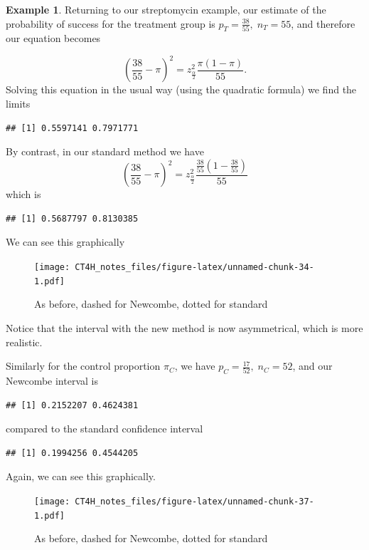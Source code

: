 \documentclass[
  openany]{book}
\theoremstyle{definition}
\theoremstyle{definition}
\newtheorem{example}{Example}[chapter]
\theoremstyle{definition}
\theoremstyle{definition}
\theoremstyle{remark}
\begin{document}
\begin{example}

Returning to our streptomycin example, our estimate of the probability of success for the treatment group is \(p_T = \frac{38}{55},\;n_T = 55\), and therefore our equation becomes

\[\left(\frac{38}{55} - \pi\right)^2 = z^2_{\frac{\alpha}{2}}\frac{\pi\left(1-\pi\right)}{55}.\]
Solving this equation in the usual way (using the quadratic formula) we find the limits

\begin{verbatim}
## [1] 0.5597141 0.7971771
\end{verbatim}

By contrast, in our standard method we have
\[\left(\frac{38}{55} - \pi\right)^2 = z^2_{\frac{\alpha}{2}}\frac{\frac{38}{55}\left(1-\frac{38}{55}\right)}{55}\]
which is

\begin{verbatim}
## [1] 0.5687797 0.8130385
\end{verbatim}

We can see this graphically

\begin{figure}
\centering
\texttt{[image: CT4H\_notes\_files/figure-latex/unnamed-chunk-34-1.pdf]}
\caption{\label{fig:unnamed-chunk-34}As before, dashed for Newcombe, dotted for standard}
\end{figure}

Notice that the interval with the new method is now asymmetrical, which is more realistic.

Similarly for the control proportion \(\pi_C\), we have \(p_C = \frac{17}{52},\; n_C=52\), and our Newcombe interval is

\begin{verbatim}
## [1] 0.2152207 0.4624381
\end{verbatim}

compared to the standard confidence interval

\begin{verbatim}
## [1] 0.1994256 0.4544205
\end{verbatim}

Again, we can see this graphically.

\begin{figure}
\centering
\texttt{[image: CT4H\_notes\_files/figure-latex/unnamed-chunk-37-1.pdf]}
\caption{\label{fig:unnamed-chunk-37}As before, dashed for Newcombe, dotted for standard}
\end{figure}

\end{example}
\end{document}
